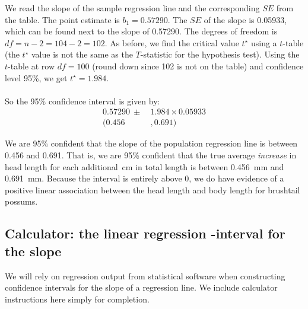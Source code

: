 \begin{examplewrap}
\begin{nexample}
\begin{description}
We read the slope of the sample regression line and the corresponding $SE$ from the table.  The point estimate is $b_1 = 0.57290$.  The $SE$ of the slope is 0.05933, which can be found next to the slope of 0.57290.  The degrees of freedom is $df=n-2=104-2=102$.  As before, we find the critical value $t^{\star}$ using a $t$-table (the $t^{\star}$ value is not the same as the $T$-statistic for the hypothesis test).   Using the $t$-table at row $df = 100$ (round down since 102 is not on the table) and confidence level 95\%, we get $t^{\star}=1.984$.  
\\
\\
So the 95\% confidence interval is given by:
\begin{align*}
0.57290 \ \pm\  &1.984\times  0.05933\\
 (0.456&, 0.691)
\end{align*}
\item[\inferencestep{Conclude}]  We are 95\% confident that the slope of the population regression line is between 0.456 and 0.691.  That is, we are 95\% confident that the true average \emph{increase} in head length for each additional~cm in total length is between 0.456~mm and 0.691~mm.  Because the interval is entirely above 0, we do have evidence of a positive linear association between the head length and body length for brushtail possums.  
\end{description}


\end{nexample}
\end{examplewrap}



\D{\newpage}

\subsection[Calculator: the linear regression $t$-interval for the slope]{Calculator: the linear regression -interval for the slope}
We will rely on regression output from statistical software when constructing confidence intervals for the slope of a regression line.  We include calculator instructions here simply for completion.

